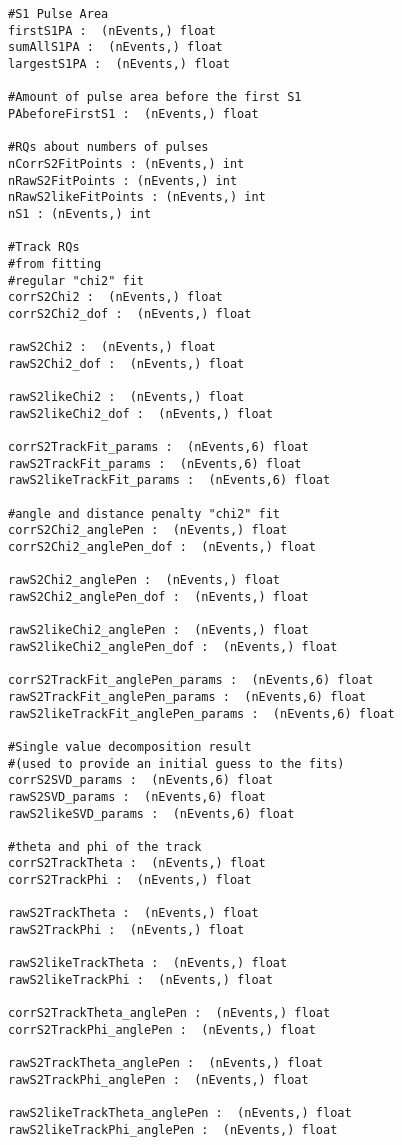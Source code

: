 \begin{Verbatim}[fontsize=\footnotesize]
#S1 Pulse Area
firstS1PA :  (nEvents,) float
sumAllS1PA :  (nEvents,) float
largestS1PA :  (nEvents,) float

#Amount of pulse area before the first S1
PAbeforeFirstS1 :  (nEvents,) float

#RQs about numbers of pulses
nCorrS2FitPoints : (nEvents,) int 
nRawS2FitPoints : (nEvents,) int 
nRawS2likeFitPoints : (nEvents,) int 
nS1 : (nEvents,) int

#Track RQs
#from fitting
#regular "chi2" fit
corrS2Chi2 :  (nEvents,) float
corrS2Chi2_dof :  (nEvents,) float

rawS2Chi2 :  (nEvents,) float
rawS2Chi2_dof :  (nEvents,) float

rawS2likeChi2 :  (nEvents,) float
rawS2likeChi2_dof :  (nEvents,) float

corrS2TrackFit_params :  (nEvents,6) float
rawS2TrackFit_params :  (nEvents,6) float
rawS2likeTrackFit_params :  (nEvents,6) float

#angle and distance penalty "chi2" fit
corrS2Chi2_anglePen :  (nEvents,) float
corrS2Chi2_anglePen_dof :  (nEvents,) float

rawS2Chi2_anglePen :  (nEvents,) float
rawS2Chi2_anglePen_dof :  (nEvents,) float

rawS2likeChi2_anglePen :  (nEvents,) float
rawS2likeChi2_anglePen_dof :  (nEvents,) float

corrS2TrackFit_anglePen_params :  (nEvents,6) float
rawS2TrackFit_anglePen_params :  (nEvents,6) float
rawS2likeTrackFit_anglePen_params :  (nEvents,6) float     

#Single value decomposition result 
#(used to provide an initial guess to the fits)
corrS2SVD_params :  (nEvents,6) float
rawS2SVD_params :  (nEvents,6) float
rawS2likeSVD_params :  (nEvents,6) float

#theta and phi of the track
corrS2TrackTheta :  (nEvents,) float 
corrS2TrackPhi :  (nEvents,) float 

rawS2TrackTheta :  (nEvents,) float 
rawS2TrackPhi :  (nEvents,) float

rawS2likeTrackTheta :  (nEvents,) float 
rawS2likeTrackPhi :  (nEvents,) float

corrS2TrackTheta_anglePen :  (nEvents,) float 
corrS2TrackPhi_anglePen :  (nEvents,) float 

rawS2TrackTheta_anglePen :  (nEvents,) float 
rawS2TrackPhi_anglePen :  (nEvents,) float 

rawS2likeTrackTheta_anglePen :  (nEvents,) float 
rawS2likeTrackPhi_anglePen :  (nEvents,) float 


\end{Verbatim}
